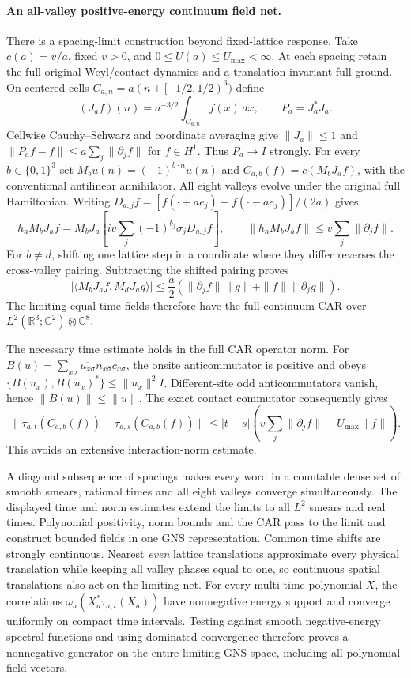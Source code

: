 \paragraph{An all-valley positive-energy continuum field net.}
There is a spacing-limit construction beyond fixed-lattice response.
Take $c(a)=v/a$, fixed $v>0$, and $0\leq U(a)\leq U_{\max}<\infty$.
At each spacing retain the full original Weyl/contact dynamics and a
translation-invariant full ground.  On centered cells
$C_{a,n}=a(n+[-1/2,1/2)^3)$ define
\[
 (J_af)(n)=a^{-3/2}\int_{C_{a,n}}f(x)\,dx,
 \qquad P_a=J_a^*J_a.
\]
Cellwise Cauchy--Schwarz and coordinate averaging give
$\|J_a\|\leq1$ and
$\|P_af-f\|\leq a\sum_j\|\partial_jf\|$ for $f\in H^1$.
Thus $P_a\to I$ strongly.  For every $b\in\{0,1\}^3$ set
$M_bu(n)=(-1)^{b\cdot n}u(n)$ and
$C_{a,b}(f)=c(M_bJ_af)$, with the conventional antilinear annihilator.
All eight valleys evolve under the original full Hamiltonian.
Writing $D_{a,j}f=[f(\cdot+ae_j)-f(\cdot-ae_j)]/(2a)$ gives
\[
 h_aM_bJ_af=M_bJ_a\!\left[iv\sum_j(-1)^{b_j}\sigma_jD_{a,j}f\right],
 \qquad \|h_aM_bJ_af\|\leq v\sum_j\|\partial_jf\|.
\]
For $b\ne d$, shifting one lattice step in a coordinate where they
differ reverses the cross-valley pairing.  Subtracting the shifted
pairing proves
\[
 |\langle M_bJ_af,M_dJ_ag\rangle|
 \leq\frac a2\left(\|\partial_jf\|\|g\|
                         +\|f\|\|\partial_jg\|\right).
\]
The limiting equal-time fields therefore have the full continuum CAR
over $L^2(\mathbb R^3;\mathbb C^2)\otimes\mathbb C^8$.

The necessary time estimate holds in the full CAR operator norm.
For $B(u)=\sum_{x\sigma}\overline{u_{x\sigma}}
n_{x\bar\sigma}c_{x\sigma}$, the onsite anticommutator is positive and
obeys $\{B(u_x),B(u_x)^*\}\leq\|u_x\|^2I$.
Different-site odd anticommutators vanish, hence $\|B(u)\|\leq\|u\|$.
The exact contact commutator consequently gives
\[
 \|\tau_{a,t}(C_{a,b}(f))-\tau_{a,s}(C_{a,b}(f))\|
 \leq |t-s|\left(v\sum_j\|\partial_jf\|+U_{\max}\|f\|\right).
\]
This avoids an extensive interaction-norm estimate.

A diagonal subsequence of spacings makes every word in a countable
dense set of smooth smears, rational times and all eight valleys
converge simultaneously.  The displayed time and norm estimates extend
the limits to all $L^2$ smears and real times.  Polynomial positivity,
norm bounds and the CAR pass to the limit and construct bounded fields
in one GNS representation.  Common time shifts are strongly continuous.
Nearest \emph{even} lattice translations approximate every physical
translation while keeping all valley phases equal to one, so continuous
spatial translations also act on the limiting net.  For every multi-time
polynomial $X$, the correlations
$\omega_a(X_a^*\tau_{a,t}(X_a))$ have nonnegative energy support and
converge uniformly on compact time intervals.  Testing against smooth
negative-energy spectral functions and using dominated convergence
therefore proves a nonnegative generator on the entire limiting GNS
space, including all polynomial-field vectors.


